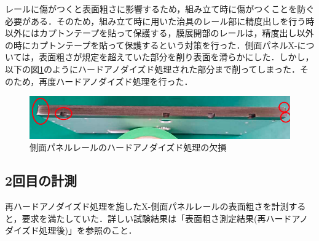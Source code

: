 レールに傷がつくと表面粗さに影響するため，組み立て時に傷がつくことを防ぐ必要がある．そのため，組み立て時に用いた治具のレール部に精度出しを行う時以外にはカプトンテープを貼って保護する，膜展開部のレールは，精度出し以外の時にカプトンテープを貼って保護するという対策を行った．側面パネルX-については，表面粗さが規定を超えていた部分を削り表面を滑らかにした．しかし，以下の図\ref{fig:scrape}のようにハードアノダイズド処理された部分まで削ってしまった．そのため，再度ハードアノダイズド処理を行った．

\begin{figure}[h]
	\begin{center}
		
		\includegraphics[width=0.8\linewidth]{04/fig/scrape.png}
		\caption{側面パネルレールのハードアノダイズド処理の欠損}
		\label{fig:scrape}
		
	\end{center}
\end{figure}

\subsection{2回目の計測}

再ハードアノダイズド処理を施したX-側面パネルレールの表面粗さを計測すると，要求を満たしていた．詳しい試験結果は「表面粗さ測定結果(再ハードアノダイズド処理後)」を参照のこと．